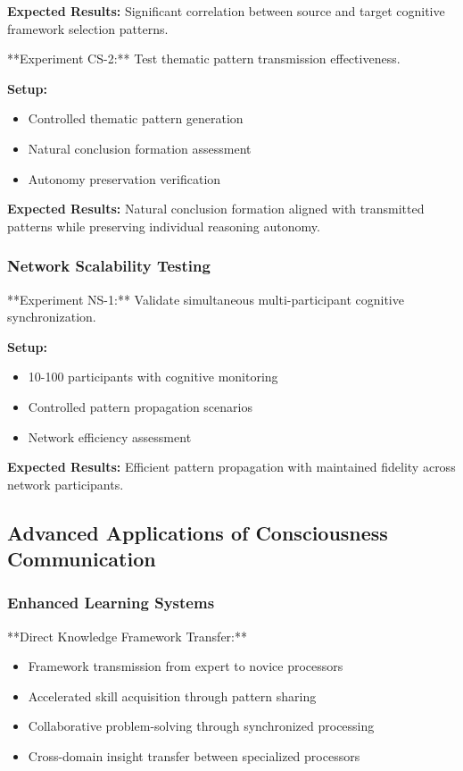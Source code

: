 \documentclass[12pt,a4paper]{article}
\begin{document}
\textbf{Expected Results:} Significant correlation between source and target cognitive framework selection patterns.

**Experiment CS-2:** Test thematic pattern transmission effectiveness.

\textbf{Setup:}
\begin{itemize}
\item Controlled thematic pattern generation
\item Natural conclusion formation assessment
\item Autonomy preservation verification
\end{itemize}

\textbf{Expected Results:} Natural conclusion formation aligned with transmitted patterns while preserving individual reasoning autonomy.

\subsubsection{Network Scalability Testing}

**Experiment NS-1:** Validate simultaneous multi-participant cognitive synchronization.

\textbf{Setup:}
\begin{itemize}
\item 10-100 participants with cognitive monitoring
\item Controlled pattern propagation scenarios
\item Network efficiency assessment
\end{itemize}

\textbf{Expected Results:} Efficient pattern propagation with maintained fidelity across network participants.

\subsection{Advanced Applications of Consciousness Communication}

\subsubsection{Enhanced Learning Systems}

**Direct Knowledge Framework Transfer:**
\begin{itemize}
\item Framework transmission from expert to novice processors
\item Accelerated skill acquisition through pattern sharing
\item Collaborative problem-solving through synchronized processing
\item Cross-domain insight transfer between specialized processors
\end{itemize}
\end{document}
